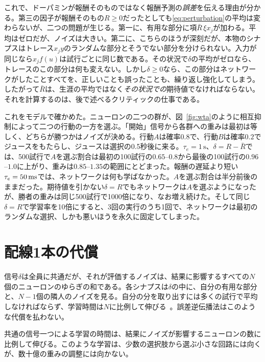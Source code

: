 これで、ドーパミンが報酬そのものではなく報酬予測の\emph{誤差}を伝える理由が分かる。第三の因子が報酬そのもの$R\ge0$だったとしても\eqref{eq:perturbation}の平均は変わらないが、二つの問題が生じる。第一に、有用な部分に項$\bar R\,\xi x_j$が加わる。平均はゼロだが、ノイズは大きい。第二に、こちらのほうが深刻だが、本物のシナプスはトレース$x_jy$のランダムな部分とそうでない部分を分けられない。入力が同じなら$x_jf(u)$は試行ごとに同じ数である。その状況で$\delta$の平均がゼロなら、トレースのこの部分は何も変えない。しかし$\delta\ge0$なら、この部分はネットワークがしたことすべてを、正しいことも誤ったことも、繰り返し強化してしまう。したがって$\bar R$は、生涯の平均ではなく\emph{その状況での}期待値でなければならない。それを計算するのは、後で述べるクリティックの仕事である。

これをモデルで確かめた。ニューロンの二つの群が、図~\ref{fig:wta}のように相互抑制によって二つの行動の一方を選ぶ。「開始」信号から各群への重みは最初は等しく、どちらが勝つかはノイズが決める。行動$A$は確率$0.8$で、行動$B$は確率$0.2$でジュースをもたらし、ジュースは選択の0.5秒後に来る。$\tau_e=1\,\text{s}$、$\delta=R-\bar R$では、500試行で$A$を選ぶ割合は最初の100試行の$0.65$--$0.8$から最後の100試行の$0.96$--$1.0$に上がり、重みは$0.85$--$1.35$の範囲にとどまった。報酬の遅延より短い$\tau_e=50\,\text{ms}$では、ネットワークは何も学ばなかった。$A$を選ぶ割合は半分前後のままだった。期待値を引かない$\delta=R$でもネットワークは$A$を選ぶようになったが、勝者の重みは同じ500試行で1000倍になり、なお増え続けた。そして同じ$\delta=R$で学習率を10倍にすると、3回の実行のうち1回で、ネットワークは最初のランダムな選択、しかも悪いほうを永久に固定してしまった。

\section{配線1本の代償}

信号$\delta$は全員に共通だが、それが評価するノイズは、結果に影響するすべての$N$個のニューロンのゆらぎの和である。各シナプスは$\delta$の中に、自分の有用な部分と、$N-1$個の隣人のノイズを見る。自分の分を取り出すには多くの試行で平均しなければならず、学習時間は$N$に比例して伸びる~\cite{Werfel2005}。誤差逆伝播法はこのような代償を払わない。

\begin{keyblock}
\begin{proposition}[ブロードキャストの代償]
\label{prop:broadcastcost}
共通の信号一つによる学習の時間は、結果にノイズが影響するニューロンの数に比例して伸びる。このような学習は、少数の選択肢から選ぶ小さな回路には向くが、数十億の重みの調整には向かない。
\end{proposition}
\end{keyblock}

